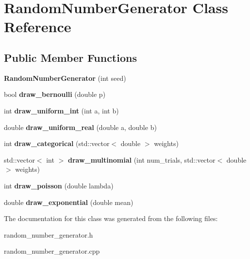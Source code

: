 \hypertarget{class_random_number_generator}{}\section{Random\+Number\+Generator Class Reference}
\label{class_random_number_generator}
\subsection*{Public Member Functions}
\begin{DoxyCompactItemize}
\item 
\mbox{\label{class_random_number_generator_aad6093b84afbbd4035ca212aa6db9353}} 
{\bfseries Random\+Number\+Generator} (int seed)
\item 
\mbox{\label{class_random_number_generator_a2b5a2fc7453d5f3efb8d27d9921fb714}} 
bool {\bfseries draw\+\_\+bernoulli} (double p)
\item 
\mbox{\label{class_random_number_generator_a450b88cf18460056a9b7b449322ff3be}} 
int {\bfseries draw\+\_\+uniform\+\_\+int} (int a, int b)
\item 
\mbox{\label{class_random_number_generator_a28136a6f138c303c07f624e5a763eab9}} 
double {\bfseries draw\+\_\+uniform\+\_\+real} (double a, double b)
\item 
\mbox{\label{class_random_number_generator_a9fea1f38af8d54ec5c08441e29710794}} 
int {\bfseries draw\+\_\+categorical} (std\+::vector$<$ double $>$ weights)
\item 
\mbox{\label{class_random_number_generator_a4cce1a302d5110c9809aa00f2da10f08}} 
std\+::vector$<$ int $>$ {\bfseries draw\+\_\+multinomial} (int num\+\_\+trials, std\+::vector$<$ double $>$ weights)
\item 
\mbox{\label{class_random_number_generator_a0eb8eab24e44cb410b42216983953542}} 
int {\bfseries draw\+\_\+poisson} (double lambda)
\item 
\mbox{\label{class_random_number_generator_a1626ad384d74574e5f75e94308f805bc}} 
double {\bfseries draw\+\_\+exponential} (double mean)
\end{DoxyCompactItemize}


The documentation for this class was generated from the following files\+:\begin{DoxyCompactItemize}
\item 
random\+\_\+number\+\_\+generator.\+h\item 
random\+\_\+number\+\_\+generator.\+cpp\end{DoxyCompactItemize}
